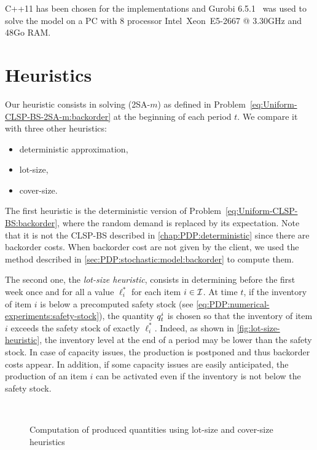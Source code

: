 C++11 has been chosen for the implementations and Gurobi 6.5.1~\cite{gurobi} was used to solve the model on a PC with 8 processor Intel\textregistered\ Xeon\texttrademark\ E5-2667 @ 3.30GHz and 48Go RAM.




\section{Heuristics}
\label{sec:PDP:numerical-experiments:heuristics}


Our heuristic consists in solving (2SA-$m$) as defined in Problem~\eqref{eq:Uniform-CLSP-BS-2SA-m:backorder} at the beginning of each period $t$.
We compare it with three other heuristics:
\begin{itemize}
  \item deterministic approximation,
  \item lot-size,
  \item cover-size.
\end{itemize}


The first heuristic is the deterministic version of Problem~\eqref{eq:Uniform-CLSP-BS:backorder}, where the random demand is replaced by its expectation.
Note that it is not the CLSP-BS described in \cref{chap:PDP:deterministic} since there are backorder costs.
When backorder cost are not given by the client, we used the method described in \cref{sec:PDP:stochastic:model:backorder} to compute them.


The second one, the {\em lot-size heuristic}, consists in determining before the first week once and for all a value $\ell_i^*$ for each item $i\in\mathcal{I}$.
At time $t$, if the inventory of item $i$ is below a precomputed safety stock (see \cref{eq:PDP:numerical-experiments:safety-stock}), the quantity $q_t^i$ is chosen so that the inventory of item $i$ exceeds the safety stock of exactly $\ell_i^*$.
Indeed, as shown in \cref{fig:lot-size-heuristic}, the inventory level at the end of a period may be lower than the safety stock.
In case of capacity issues, the production is postponed and thus backorder costs appear.
In addition, if some capacity issues are easily anticipated, the production of an item $i$ can be activated even if the inventory is not below the safety stock.

\begin{figure}[h]
  \centering
  \\
  \caption{Computation of produced quantities using lot-size and cover-size heuristics}
  \label{fig:lot-and-cover-size-heuristics}
\end{figure}



